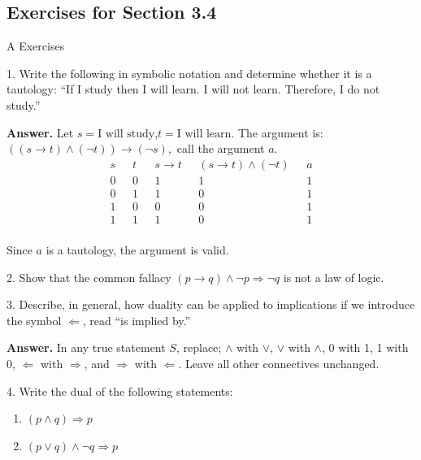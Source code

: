 \documentclass[10pt,]{book}
\theoremstyle{plain}
\theoremstyle{definition}
\theoremstyle{definition}
\theoremstyle{definition}
\theoremstyle{definition}
\begin{document}
\subsection[Exercises for Section 3.4 ]{Exercises for Section 3.4 }\label{exercises-3.4}
\hypertarget{exercisegroup-5}{}\typeout{************************************************}
\typeout{************************************************}
A Exercises%
\begin{exercisegroup}
\item[1.]\hypertarget{exercise-20}{}Write the following in symbolic notation and determine whether it is a tautology: ``If I study then I will learn. I will not learn. Therefore,
I do not study.''%
\par\smallskip
\par\smallskip
\noindent\textbf{Answer.}\hypertarget{answer-9}{}\quad
Let \(s=\textrm{I will study}\),\(t=\textrm{I will learn.}\)  The argument is: \(((s\to t)\land (\neg t))\to (\neg s) ,\) call the argument \(a\).
\begin{equation*}
\begin{array}{ccccc}
 s\text{   } & t\text{  } & s\to t\text{   } & (s\to t)\land (\neg t)\text{   } & a \\
\hline
 0\text{   } & 0\text{   } & 1\text{   } & 1\text{   } & 1 \\
 0\text{   } & 1\text{   } & 1\text{   } & 0\text{   } & 1 \\
 1\text{   } & 0\text{   } & 0\text{   } & 0\text{   } & 1 \\
 1\text{   } & 1\text{   } & 1\text{   } & 0\text{   } & 1 \\
\end{array}
\end{equation*}%
\par
Since \(a\) is a tautology, the argument is valid.%
\item[2.]\hypertarget{exercise-21}{}Show that the common fallacy \((p\to  q) \land  \neg p \Rightarrow  \neg q\) is not a law of logic.%
\par\smallskip
\item[3.]\hypertarget{exercise-22}{}Describe, in general, how duality can be applied to implications if we introduce the symbol \(\Leftarrow\), read ``is implied by.''%
\par\smallskip
\par\smallskip
\noindent\textbf{Answer.}\hypertarget{answer-10}{}\quad
 In any true statement \(S\), replace; \(\land\) with
 \(\lor\),  \(\lor\) with \(\land\), 0 with 1, 1 with 0, \(\Leftarrow\) with
  \(\Rightarrow \), and \(\Rightarrow \) with \(\Leftarrow \). Leave all other connectives unchanged.%
\item[4.]\hypertarget{exercise-23}{}Write the dual of the following statements:%
\par
\leavevmode%
\begin{enumerate}[label=\alph*]
\item\hypertarget{li-103}{}\((p \land q)\Rightarrow p\)%
\item\hypertarget{li-104}{}\((p\lor q)\land \neg q\Rightarrow p\)%
\end{enumerate}
%
\par\smallskip
\end{exercisegroup}
\end{document}

